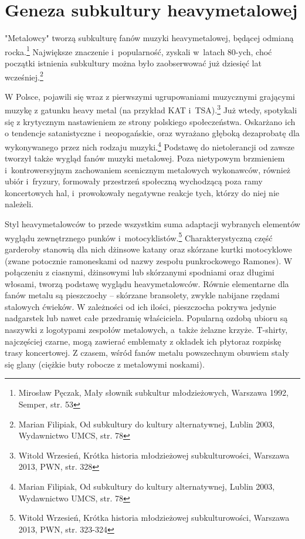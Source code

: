 \documentclass[12pt, a4paper, titlepage]{report}
\begin{document}
\section{Geneza subkultury heavymetalowej}
"Metalowcy" tworzą subkulturę fanów muzyki heavymetalowej, będącej odmianą rocka.\footnote{Mirosław Pęczak, Mały słownik subkultur młodzieżowych, Warszawa 1992, Semper, str. 53}  Największe znaczenie i~popularność, zyskali w~latach 80-ych, choć początki istnienia subkultury można było zaobserwować już dziesięć lat wcześniej.\footnote{Marian Filipiak, Od subkultury do kultury alternatywnej, Lublin 2003, Wydawnictwo UMCS, str. 78} 

W Polsce, pojawili się wraz z pierwszymi ugrupowaniami muzycznymi grającymi muzykę z gatunku heavy metal (na przykład KAT i~TSA).\footnote{Witold Wrzesień, Krótka historia młodzieżowej subkulturowości, Warszawa 2013, PWN, str. 328} Już wtedy, spotykali się z krytycznym nastawieniem ze strony polskiego społeczeństwa. Oskarżano ich o tendencje satanistyczne i~neopogańskie, oraz wyrażano głęboką dezaprobatę dla wykonywanego przez nich rodzaju muzyki.\footnote{Marian Filipiak, Od subkultury do kultury alternatywnej, Lublin 2003, Wydawnictwo UMCS, str. 78} %
Podstawę do nietolerancji od zawsze tworzył także wygląd fanów muzyki metalowej. Poza nietypowym brzmieniem i~kontrowersyjnym zachowaniem scenicznym metalowych wykonawców, również ubiór i~fryzury, formowały przestrzeń społeczną wychodzącą poza ramy koncertowych hal, i~prowokowały negatywne reakcje tych, którzy do niej nie należeli. 
 
Styl heavymetalowców to przede wszystkim suma adaptacji wybranych elementów wyglądu zewnętrznego punków i~motocyklistów.\footnote{Witold Wrzesień, Krótka historia młodzieżowej subkulturowości, Warszawa 2013, PWN, \break str. 323-324} Charakterystyczną \break część garderoby stanowią dla nich dżinsowe katany oraz skórzane kurtki motocyklowe (zwane potocznie ramoneskami od nazwy zespołu punkrockowego Ramones). W połączeniu z ciasnymi, dżinsowymi lub skórzanymi spodniami oraz długimi włosami, tworzą podstawę wyglądu heavymetalowców. Równie elementarne dla fanów metalu są pieszczochy -- skórzane bransolety, zwykle nabijane rzędami stalowych ćwieków. W zależności od ich ilości, pieszczocha pokrywa jedynie nadgarstek lub nawet całe przedramię właściciela. Popularną ozdobą ubioru są naszywki z logotypami zespołów metalowych, a~także żelazne krzyże. T-shirty, najczęściej czarne, mogą zawierać emblematy z okładek ich płyt\footnotemark[\value{footnote}] oraz rozpiskę trasy koncertowej. %
Z czasem, wśród fanów metalu powszechnym obuwiem stały się glany (ciężkie buty robocze z metalowymi noskami). 
\end{document}
